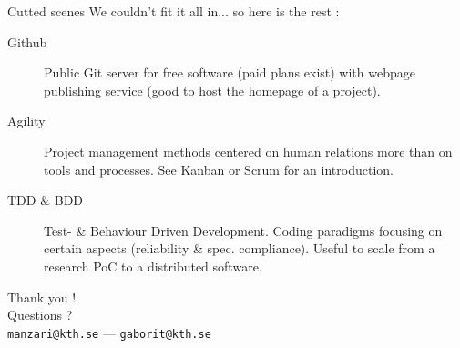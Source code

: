 \documentclass[10pt]{beamer}
\begin{document}
\begin{frame}{Cutted scenes}
		We couldn't fit it all in... so here is the rest :

		\begin{description}
			\item[Github] Public Git server for free software (paid plans exist)
				with webpage publishing service (good to host the homepage of a project).
			\item[Agility] Project management methods centered on human relations more than on
				tools and processes. See Kanban or Scrum for an introduction.
			\item[TDD \& BDD] Test- \& Behaviour Driven Development. Coding paradigms focusing
				on certain aspects (reliability \& spec. compliance). Useful to scale from a
				research PoC to a distributed software.
		\end{description}
\end{frame}


\begin{frame}[standout] %
	Thank you !\\
	\vspace{0.05\textwidth}
	Questions ?\\
	\vspace{0.25\textwidth}
	\scriptsize{\texttt{manzari@kth.se}} --- \scriptsize{\texttt{gaborit@kth.se}}\\
\end{frame}

\end{document}
